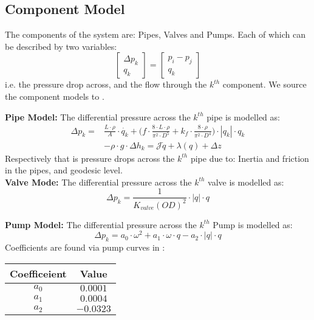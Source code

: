 \subsection{Component Model}
The components of the system are: Pipes, Valves and Pumps. Each of which can be described by two variables:
\begin{equation*}
	\begin{bmatrix} \Delta{p_k}\\q_k\end{bmatrix}=\begin{bmatrix}
		p_i-p_j\\q_k
	\end{bmatrix}
\end{equation*}
i.e. the pressure drop across, and the flow through the $ k^{th} $ component. We source the component models to \cite{Swamee2008}.

\textbf{Pipe Model:}
The differential pressure across the $ k^{th} $ pipe is modelled as:
\begin{equation}
	\begin{split}
		\Delta{p_{k}} = &\frac{L\cdot \rho}{A}\cdot \dot{q_{k}}
		+\Big(f \cdot \frac{8\cdot L\cdot \rho}{\pi^{2} \cdot D^{5}} + k_{f}\cdot \frac{8\cdot \rho}{\pi^{2} \cdot D^{4}}\Big)\cdot |q_{k}|\cdot q_{k}\\
		&- \rho \cdot g \cdot \Delta{h_{k}} = \mathcal{J}\dot{q} + \lambda(q) + \Delta z
	\end{split}
\end{equation}
Respectively that is pressure drops across the $ k^{th} $ pipe due to: Inertia and friction in the pipes, and geodesic level.\\
 
\textbf{Valve Mode:}
The differential pressure across the $ k^{th} $ valve is modelled as:
\begin{equation}
	\Delta p_{k} = \frac{1}{K_{valve}(OD)^2} \cdot |q|\cdot q
\end{equation}

\textbf{Pump Model:}
The differential pressure across the $ k^{th} $ Pump is modelled as:
\begin{equation}\label{eq:PumpPressure}
	\Delta p_{k} =   a_0\cdot \omega^2 +  a_1\cdot \omega \cdot q -a_2\cdot |q|\cdot q
\end{equation}
Coefficients are found via pump curves in \cite{GrundfosDatablad}:

\begin{table}[thpb]
	\centering
	\begin{tabular}{cc}
		\toprule
		Coefficeient & Value  \\ \toprule
		$a_0$  &   $0.0001$   \\ 
		$a_1$  &   $0.0004$   \\
		$a_2$  &   $-0.0323$  \\ \bottomrule
	\end{tabular}
	\label{tab:PumpCoeff}
\end{table}

